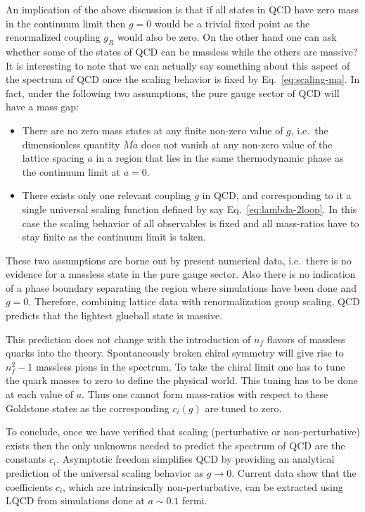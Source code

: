 An implication of the above discussion is that if all states in QCD have
zero mass in the continuum limit then $g = 0$ would be a trivial fixed
point as the renormalized coupling $g_R$ would also be zero. On the other
hand one can ask whether some of the states of QCD can be massless while
the others are massive? It is interesting to note that we can actually say
something about this aspect of the spectrum of QCD once the scaling
behavior is fixed by Eq.~\eqref{eq:scaling-ma}. In fact, under the following
two assumptions, the pure gauge sector of QCD will have a mass gap:
\begin{itemize}
  \item There are no zero mass states at any finite non-zero value of $g$,
    i.e.\ the dimensionless quantity $M a$ does not vanish at any non-zero
    value of the lattice spacing $a$ in a region that lies in the same
    thermodynamic phase as the continuum limit at $a = 0$.
  \item There exists only one relevant coupling $g$ in QCD, and
    corresponding to it a single universal scaling function defined by say
    Eq.~\eqref{eq:lambda-2loop}. In this case the scaling behavior of all
    observables is fixed and all mass-ratios have to stay finite as the
    continuum limit is taken.
\end{itemize}
These two assumptions are borne out by present numerical data, i.e.\ there
is no evidence for a massless state in the pure gauge sector. Also there is
no indication of a phase boundary separating the region where simulations
have been done and $g = 0$. Therefore, combining lattice data with
renormalization group scaling, QCD predicts that the lightest glueball
state is massive.

This prediction does not change with the introduction of $n_f$ flavors of
massless quarks into the theory. Spontaneously broken chiral symmetry will
give rise to $n_f^2 - 1$ massless pions in the spectrum. To take the chiral
limit one has to tune the quark masses to zero to define the physical
world. This tuning has to be done at each value of $a$. Thus one cannot
form mass-ratios with respect to these Goldstone states as the
corresponding $c_i(g)$ are tuned to zero.

To conclude, once we have verified that scaling (perturbative or
non-perturbative) exists then the only unknowns needed to predict the
spectrum of QCD are the constants $c_i$. Asymptotic freedom simplifies QCD
by providing an analytical prediction of the universal scaling behavior as
$g \to 0$. Current data show that the coefficients $c_i$, which are
intrinsically non-perturbative, can be extracted using LQCD from
simulations done at $a \sim 0.1$ fermi.

